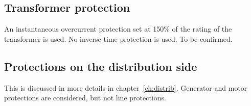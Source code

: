 \subsection{Transformer protection}

An instantaneous overcurrent protection set at 150\% of the rating of the transformer is used. No inverse-time protection is used. To be confirmed.

\subsection{Protections on the distribution side}

This is discussed in more details in chapter~\ref{ch:distrib}. Generator and motor protections are considered, but not line protections.
